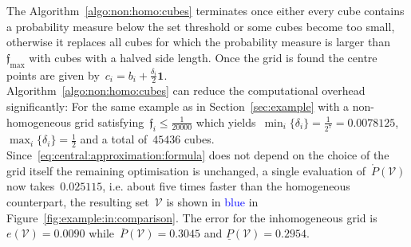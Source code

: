 \documentclass[letterpaper, 10pt, conference]{ieeeconf} %
\providecommand{\bfa}[1]{\mathbf{#1}}
\begin{document}
%
The Algorithm~\ref{algo:non:homo:cubes} terminates once either every cube contains a probability measure below the set threshold or some cubes become too small, otherwise it replaces all cubes for which the probability measure is larger than~$\mathfrak{f}_{\max}$ with cubes with a halved side length.
%
Once the grid is found the centre points are given by~$c_i=b_i+\frac{\delta_i}{2}\bfa{1}$.
%
\\[1em]
%
Algorithm~\ref{algo:non:homo:cubes} can reduce the computational overhead significantly:
%
For the same example as in Section~\ref{sec:example} with a non-homogeneous grid satisfying~$\mathfrak{f}_i\leq\frac{1}{20000}$ which yields~$\min_i\{\delta_i\}=\frac{1}{2^7}=0.0078125$,~$\max_i\{\delta_i\}=\frac{1}{2}$ and a total of~$45436$ cubes.
%
Since~\eqref{eq:central:approximation:formula} does not depend on the choice of the grid itself the remaining optimisation is unchanged, a single evaluation of~$\mathring{P}(\mathcal V)$ now takes~$0.025115$, i.e. about five times  faster than the homogeneous counterpart, the resulting set~$\mathcal V$ is shown in \textcolor{blue}{blue} in Figure~\ref{fig:example:in:comparison}.
%
The error for the inhomogeneous grid is~$e(\mathcal V)=0.0090$ while~$\overline{P}(\mathcal V) = 0.3045$ and $\underline{P}(\mathcal V) = 0.2954$.
\end{document}
